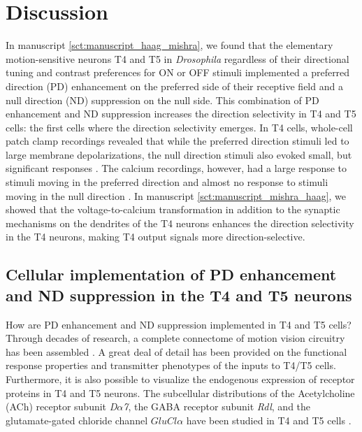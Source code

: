 \chapter{Discussion}
\label{chp:Discussion}
In manuscript \ref{sct:manuscript_haag_mishra}, we found that the elementary motion-sensitive neurons T4 and T5 in \textit{Drosophila} regardless of their directional tuning and contrast preferences for ON or OFF stimuli implemented a preferred direction (PD) enhancement on the preferred side of their receptive field and a null direction (ND) suppression on the null side. This combination of PD enhancement and ND suppression increases the direction selectivity in T4 and T5 cells: the first cells where the direction selectivity emerges. In T4 cells, whole-cell patch clamp recordings revealed that while the preferred direction stimuli led to large membrane depolarizations, the null direction stimuli also evoked small, but significant responses \parencite{Groschner2022}. The calcium recordings, however, had a large response to stimuli moving in the preferred direction and almost no response to stimuli moving in the null direction \parencite{Maisak2013, Fisher2015}. In manuscript \ref{sct:manuscript_mishra_haag}, we showed that the voltage-to-calcium transformation in addition to the synaptic mechanisms on the dendrites of the T4 neurons enhances the direction selectivity in the T4 neurons, making T4 output signals more direction-selective.  

\section{Cellular implementation of PD enhancement and ND suppression in the T4 and T5 neurons}
How are PD enhancement and ND suppression implemented in T4 and T5 cells?  Through decades of research, a complete connectome of motion vision circuitry has been assembled \parencite{Takemura2008, Takemura2017, Shinomiya2014, Shinomiya2019}. A great deal of detail has been provided on the functional response properties \parencite{Arenz2017, Drews2020, Strother2017, Serbe2016} and transmitter phenotypes \parencite{Davis2020, Shinomiya2019, Takemura2017} of the inputs to T4/T5 cells. Furthermore, it is also possible to visualize the endogenous expression of receptor proteins in T4 and T5 neurons. The subcellular distributions of the Acetylcholine (ACh) receptor subunit \textit{D$\alpha$7}, the GABA receptor subunit \textit{Rdl}, and the glutamate-gated chloride channel \textit{$GluCl\alpha$} have been studied in T4 and T5 cells \parencite{Fendl2020}.

